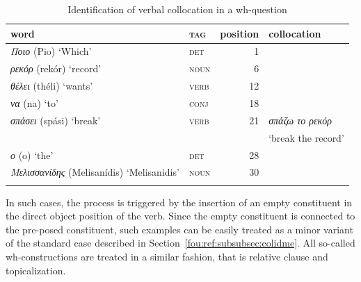 \documentclass[output=paper]{langsci/langscibook}
\begin{document}


\begin{table}[h]
  {\small 
    \begin{tabular}{l>{\scshape}lrl}
      \lsptoprule
      word & \normalfont tag & position & collocation \\ %
      \midrule
          \textit{Ποιο} (Pio) `Which' & 	det & 	1	\\
          \textit{ρεκόρ} (rekór) `record' & noun & 	6 		 \\
          \textit{θέλει}	 (théli) `wants' & verb & 	12	 \\
          \textit{να}	(na) `to' & conj & 18	 \\
          \textit{σπάσει}	(spási) `break' & verb & 	21	 & 	\textit{σπάζω το ρεκόρ} \\ & & & `break the record'\\
          \textit{ο}  (o) `the' & det & 	28	 \\
          \textit{Μελισσανίδης}	(Melisanídis) `Melisanidis' & noun  & 30	 \tabularnewline	 %
          \lspbottomrule
    \end{tabular}
  }
  \caption{\label{fou:fig4}Identification of verbal collocation in a wh-question}
\end{table} 


In such cases, the  process is triggered by the insertion of an empty constituent in the direct object position of the verb. Since the empty constituent is connected to the pre-posed constituent, such examples can be easily treated as a minor variant of the standard case described in Section~\ref{fou:ref:subsubsec:colidme}. All so-called wh-constructions are treated in a similar fashion, that is relative clause and topicalization. 

\end{document}
